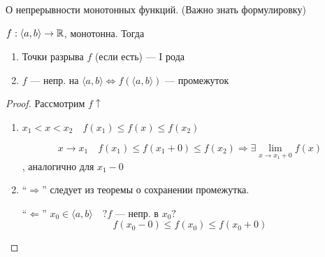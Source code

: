    \begin{theorem}
        О непрерывности монотонных функций. (Важно знать формулировку)

        $f:\langle a,b\rangle \to\mathbb{R}$, монотонна. Тогда
        \begin{enumerate}
            \item Точки разрыва $f$ (если есть) --- I рода
            \item $f$ --- непр. на $\langle a,b\rangle \Leftrightarrow f(\langle a,b\rangle)$ --- промежуток
        \end{enumerate}
    \end{theorem}
    \begin{proof}
        Рассмотрим $f\uparrow$
        \begin{enumerate}
            \item $x_1<x<x_2 \quad f(x_1)\leq f(x)\leq f(x_2)$
            
            $$x\to x_1 \quad f(x_1)\leq f(x_1+0)\leq f(x_2) \Rightarrow \exists\lim\limits_{x\to x_1+0} f(x)$$, аналогично для $x_1-0$
            
            \item ``$\Rightarrow$'' следует из теоремы о сохранении промежутка.
            
            ``$\Leftarrow$'' $x_0\in\langle a,b\rangle \quad ?f$ --- непр. в $x_0?$
            $$f(x_0-0)\leq f(x_0)\leq f(x_0+0)$$
        \end{enumerate}
    \end{proof}
